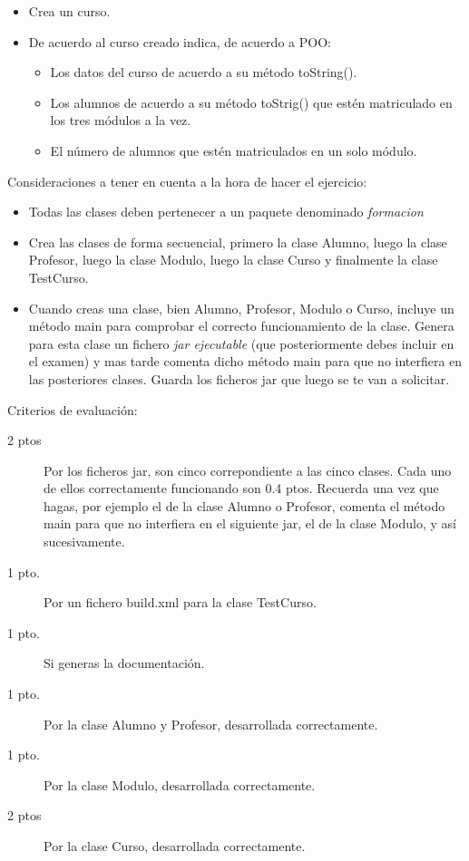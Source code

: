 \documentclass[addpoints,12pt]{exam}
\begin{document}
\begin{questions}
\begin{description}
\begin{itemize}
\item Crea un curso.
\item De acuerdo al curso creado indica, de acuerdo a POO:
\begin{itemize}
\item Los datos del curso de acuerdo a su método toString().
\item Los alumnos de acuerdo a su método toStrig() que estén matriculado en los tres módulos a la vez.
\item El número de alumnos que estén matriculados en un solo módulo.
\end{itemize}
\end{itemize}
\end{description}
Consideraciones a tener en cuenta a la hora de hacer el ejercicio:
\begin{itemize}
\item Todas las clases deben pertenecer a un paquete denominado \emph{formacion}
\item Crea las clases de forma secuencial, primero la clase Alumno, luego la clase Profesor, luego la clase Modulo, luego la clase Curso y finalmente la clase TestCurso.
\item Cuando creas una clase, bien Alumno, Profesor, Modulo o Curso, incluye un método main para comprobar el correcto funcionamiento de la clase. Genera para esta clase un fichero \emph{jar ejecutable} (que posteriormente debes incluir en el examen) y mas tarde comenta dicho método main para que no interfiera en las posteriores clases. Guarda los ficheros jar que luego se te van a solicitar.
\end{itemize}
Criterios de evaluación:
\begin{description}
\item[2 ptos] Por los ficheros jar, son cinco correpondiente a las cinco clases. Cada uno de ellos correctamente funcionando son 0.4 ptos. Recuerda una vez que hagas, por ejemplo el de la clase Alumno o Profesor, comenta el método main para que no interfiera en el siguiente jar, el de la clase Modulo, y así sucesivamente.
\item[1 pto.] Por un fichero build.xml para la clase TestCurso.
\item[1 pto.] Si generas la documentación.
\item[1 pto.] Por la clase Alumno y Profesor, desarrollada correctamente.
\item[1 pto.] Por la clase Modulo, desarrollada correctamente.
\item[2 ptos] Por la clase Curso, desarrollada correctamente.

\end{description}
\end{questions}
\end{document}
